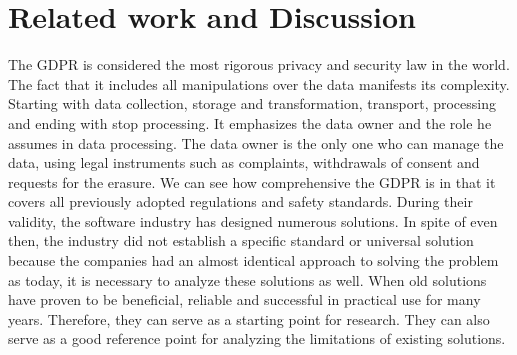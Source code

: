 \documentclass[11pt,english]{article}
\begin{document}
\section{Related work and Discussion}
The GDPR is considered the most rigorous privacy and security law in the world. The fact that it includes all manipulations over the data manifests its complexity. Starting with data collection, storage and transformation, transport, processing and ending with stop processing. It emphasizes the data owner and the role he assumes in data processing. The data owner is the only one who can manage the data, using legal instruments such as complaints, withdrawals of consent and requests for the erasure. We can see how comprehensive the GDPR is in that it covers all previously adopted regulations and safety standards. During their validity, the software industry has designed numerous solutions. In spite of even then, the industry did not establish a specific standard or universal solution because the companies had an almost identical approach to solving the problem as today, it is necessary to analyze these solutions as well. When old solutions have proven to be beneficial, reliable and successful in practical use for many years. Therefore, they can serve as a starting point for research. They can also serve as a good reference point for analyzing the limitations of existing solutions.
\end{document}
